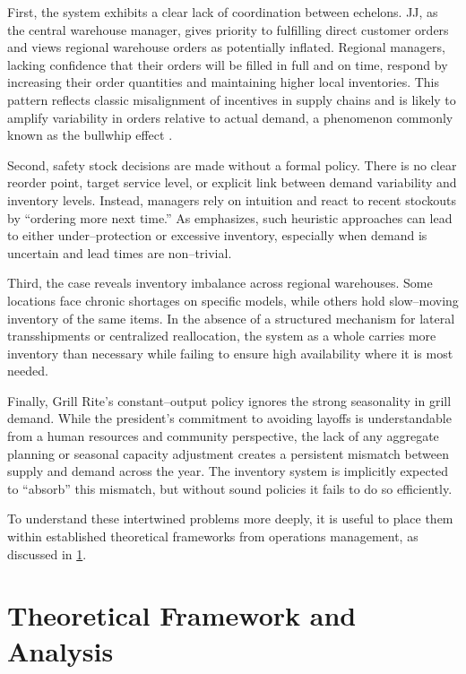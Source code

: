 \documentclass[12pt,a4paper]{article}
\begin{document}
First, the system exhibits a clear lack of coordination between echelons. JJ, as the central warehouse manager, gives priority to fulfilling direct customer orders and views regional warehouse orders as potentially inflated. Regional managers, lacking confidence that their orders will be filled in full and on time, respond by increasing their order quantities and maintaining higher local inventories. This pattern reflects classic misalignment of incentives in supply chains and is likely to amplify variability in orders relative to actual demand, a phenomenon commonly known as the bullwhip effect \citep{cachon2018matching}.

Second, safety stock decisions are made without a formal policy. There is no clear reorder point, target service level, or explicit link between demand variability and inventory levels. Instead, managers rely on intuition and react to recent stockouts by ``ordering more next time.'' As \citet{stevenson2017operations} emphasizes, such heuristic approaches can lead to either under–protection or excessive inventory, especially when demand is uncertain and lead times are non–trivial.

Third, the case reveals inventory imbalance across regional warehouses. Some locations face chronic shortages on specific models, while others hold slow–moving inventory of the same items. In the absence of a structured mechanism for lateral transshipments or centralized reallocation, the system as a whole carries more inventory than necessary while failing to ensure high availability where it is most needed.

Finally, Grill Rite's constant–output policy ignores the strong seasonality in grill demand. While the president's commitment to avoiding layoffs is understandable from a human resources and community perspective, the lack of any aggregate planning or seasonal capacity adjustment creates a persistent mismatch between supply and demand across the year. The inventory system is implicitly expected to ``absorb'' this mismatch, but without sound policies it fails to do so efficiently.

To understand these intertwined problems more deeply, it is useful to place them within established theoretical frameworks from operations management, as discussed in \cref{sec:theoretical_framework}.

\section{Theoretical Framework and Analysis}
\label{sec:theoretical_framework}
\end{document}
